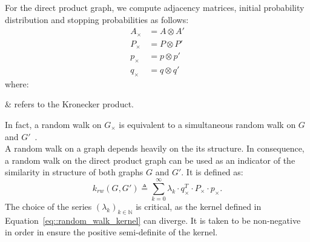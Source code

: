                     For the direct product graph, we compute adjacency matrices, initial probability distribution and stopping probabilities as follows:
                    \begin{align}
                        \label{eq::direct_product_graph_walk}
                        A_{\times} &= A \otimes A'\\
                        P_{\times} &= P \otimes P'\\
                        p_{\times} &= p \otimes p'\\
                        q_{\times} &= q \otimes q'
                    \end{align}
                    where:
                    \begin{conditions}
                        \otimes & refers to the Kronecker product.
                    \end{conditions}
                    In fact, a random walk on $G_{\times}$ is equivalent to a simultaneous random walk on $G$ and $G'$~\parencite{hammack2011handbook}.\\

                    A random walk on a graph depends heavily on the its structure.
                    In consequence, a random walk on the direct product graph can be used as an indicator of the similarity in structure of both graphs $G$ and $G'$.
                    It is defined as:
                    \begin{equation}
                        \label{eq::random_walk_kernel}
                        k_{rw}(G, G') \triangleq \sum_{k=0}^\infty \lambda_k \cdot q_{\times}^T\cdot P_{\times}\cdot p_{\times}.
                    \end{equation}
                    The choice of the series $\left(\lambda_k\right)_{k\in \mathbb{N}}$ is critical, as the kernel defined in Equation~\ref{eq::random_walk_kernel} can diverge.
                    It is taken to be non-negative in order in ensure the positive semi-definite of the kernel.\\

